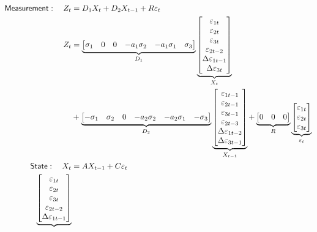 \documentclass[a4paper,12pt]{article}
\begin{document}
\begin{align}
\mathsf{Measurement}:\quad Z_{t}& =D_{1}X_{t}+D_{2}X_{t-1}+R\varepsilon _{t}
\notag \\
Z_{t}& =\underbrace{%
\begin{bmatrix}
\sigma _{1} & 0 & 0 & -a_{1}\sigma _{2} & -a_{1}\sigma _{1} & \sigma _{3}%
\end{bmatrix}%
}_{D_{1}}\underbrace{%
\begin{bmatrix}
\varepsilon _{1t} \\ 
\varepsilon _{2t} \\ 
\varepsilon _{3t} \\ 
\varepsilon _{2t-2} \\ 
\Delta \varepsilon _{1t-1} \\ 
\Delta \varepsilon _{3t}%
\end{bmatrix}%
}_{X_{t}} \\
& +\underbrace{%
\begin{bmatrix}
-\sigma _{1} & \sigma _{2} & 0 & -a_{2}\sigma _{2} & -a_{2}\sigma _{1} & 
-\sigma _{3}%
\end{bmatrix}%
}_{D_{2}}\underbrace{%
\begin{bmatrix}
\varepsilon _{1t-1} \\ 
\varepsilon _{2t-1} \\ 
\varepsilon _{3t-1} \\ 
\varepsilon _{2t-3} \\ 
\Delta \varepsilon _{1t-2} \\ 
\Delta \varepsilon _{3t-1}%
\end{bmatrix}%
}_{X_{t-1}}+\underbrace{%
\begin{bmatrix}
0 & 0 & 0%
\end{bmatrix}%
}_{R}\underbrace{%
\begin{bmatrix}
\varepsilon _{1t} \\ 
\varepsilon _{2t} \\ 
\varepsilon _{3t}%
\end{bmatrix}%
}_{\varepsilon _{t}} \\
\mathsf{State}:\quad X_{t}& =AX_{t-1}+C\varepsilon _{t} \\
\underbrace{%
\begin{bmatrix}
\varepsilon _{1t} \\ 
\varepsilon _{2t} \\ 
\varepsilon _{3t} \\ 
\varepsilon _{2t-2} \\ 
\Delta \varepsilon _{1t-1} \\ 

\end{bmatrix}}
\end{align}
\end{document}
